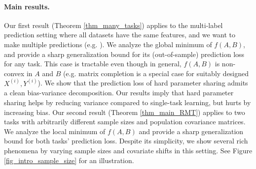 


\paragraph{Main results.}
Our first result (Theorem \ref{thm_many_tasks}) applies to the multi-label prediction setting where all datasets have the same features, and we want to make multiple predictions (e.g. \cite{hsu2009multi}).
We analyze the global minimum of $f(A, B)$, and provide a sharp generalization bound for its (out-of-sample) prediction loss for any task.
This case is tractable even though in general, $f(A, B)$ is non-convex in $A$ and $B$ (e.g. matrix completion is a special case for suitably designed $X^{(i)}, Y^{(i)}$).
We show that the prediction loss of hard parameter sharing admits a clean bias-variance decomposition.
Our results imply that hard parameter sharing helps by reducing variance compared to single-task learning, but hurts by increasing bias.
Our second result (Theorem \ref{thm_main_RMT}) applies to two tasks with arbitrarily different sample sizes and population covariance matrices.
We analyze the local minimum of $f(A, B)$ and provide a sharp generalization bound for both tasks' prediction loss.
Despite its simplicity, we show several rich phenomena by varying sample sizes and covariate shifts in this setting.
See Figure \ref{fig_intro_sample_size} for an illustration.

